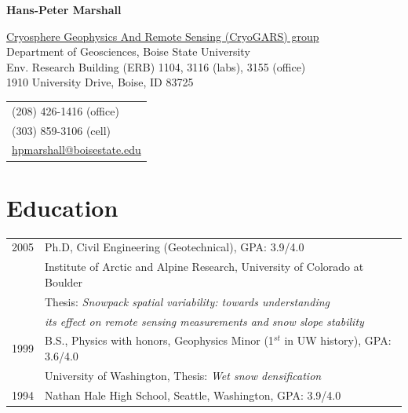 \documentclass[11pt]{article}
\def\name{Hans-Peter Marshall}
\begin{document}


\centerline{\Large \bf \name}

\vspace{0.25in}

\begin{minipage}{0.70\linewidth}
  \href{https://sites.google.com/boisestate.edu/cryogarswebsite/}{Cryosphere Geophysics And Remote Sensing (CryoGARS) group} \\
  Department of Geosciences, Boise State University \\
  Env. Research Building (ERB) 1104, 3116 (labs), 3155 (office) \\
  1910 University Drive, Boise, ID  83725 \\
\end{minipage}
\begin{minipage}{0.30\linewidth}
  \begin{tabular}{l}
     (208) 426-1416 (office) \\
     (303) 859-3106 (cell) \\
    \href{mailto:hpmarshall@boisestate.edu}{hpmarshall@boisestate.edu} \\
  \end{tabular}
\end{minipage}

\vspace{-0.3cm}

\section*{Education}

\begin{tabular}{ll}
	2005 & Ph.D, Civil Engineering (Geotechnical), GPA: 3.9/4.0 \\
	          & Institute of Arctic and Alpine Research, University of Colorado at Boulder \\
		 & Thesis: \textit{Snowpack spatial variability: towards understanding} \\
                  &   \textit{its effect on remote sensing measurements and snow slope stability} \\
	1999 &  B.S., Physics with honors, Geophysics Minor (1$^{st}$ in UW history), GPA: 3.6/4.0 \\
	         &   University of Washington, Thesis: \textit{Wet snow densification} \\
       1994  &  Nathan Hale High School, Seattle, Washington, GPA: 3.9/4.0 \\
\end{tabular}
\end{document}
